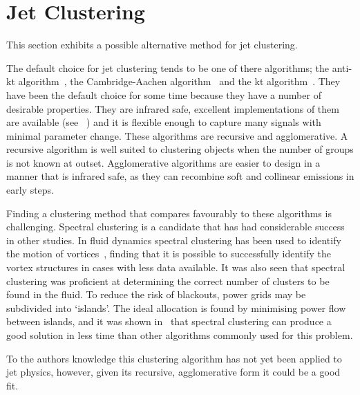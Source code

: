 \section{Jet Clustering}
This section exhibits a possible alternative method for jet clustering.

The default choice for jet clustering tends to be one of there algorithms;
the anti-kt algorithm~\cite{Cacciari2008akt}, the Cambridge-Aachen algorithm~\cite{Wobisch1998caJet} and the kt algorithm~\cite{Ellis1993ktJet}.
They have been the default choice for some time because they have a number of desirable properties.
They are infrared safe, excellent implementations of them are available (see \fastjet{}~\cite{Cacciari2011FastJet})
and it is flexible enough to capture many signals with minimal parameter change.
These algorithms are recursive and agglomerative.
A recursive algorithm is well suited to clustering objects when the number of groups is not known at outset.
Agglomerative algorithms are easier to design in a manner that is infrared safe,
as they can recombine soft and collinear emissions in early steps.

Finding a clustering method that compares favourably to these algorithms is challenging.
Spectral clustering is a candidate that has had considerable success in other studies.
In fluid dynamics spectral clustering has been used to identify the motion
of vortices~\cite{hadjighasem2016votex}, finding that it is possible
to successfully identify the vortex structures in cases with less data available.
It was also seen that spectral clustering was proficient at determining the correct number
of clusters to be found in the fluid.
To reduce the risk of blackouts, power grids may be subdivided into `islands'.
The ideal allocation is found by minimising power flow between islands,
and it was shown in~\cite{fennelly2014power} that spectral clustering
can produce a good solution in less time than other algorithms commonly used for this problem.


To the authors knowledge this clustering algorithm has not yet been applied to jet physics, %
however, given its recursive, agglomerative form it could be a good fit.
